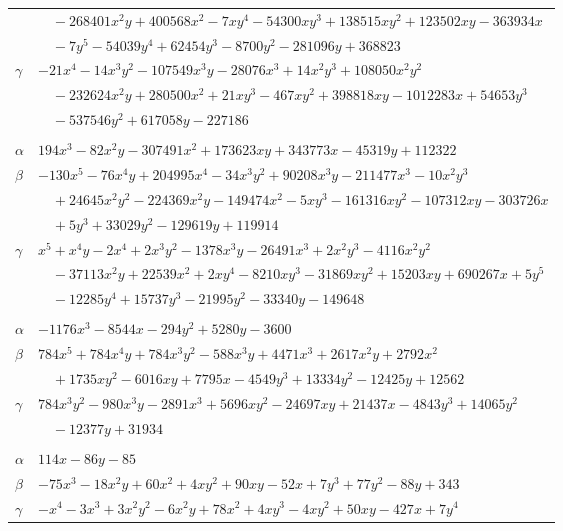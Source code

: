 \documentclass[11pt]{article}
\begin{document}
\begin{longtable}{@{}ll@{}}
 & $\quad -268401x^{2}y+400568x^{2}-7xy^{4}-54300xy^{3}+138515xy^{2}+123502xy-363934x$\\
 & $\quad -7y^{5}-54039y^{4}+62454y^{3}-8700y^{2}-281096y+368823$\\
$\gamma$ & $-21x^{4}-14x^{3}y^{2}-107549x^{3}y-28076x^{3}+14x^{2}y^{3}+108050x^{2}y^{2}$\\
 & $\quad -232624x^{2}y+280500x^{2}+21xy^{3}-467xy^{2}+398818xy-1012283x+54653y^{3}$\\
 & $\quad -537546y^{2}+617058y-227186$\\
\addlinespace[3pt]
\multicolumn{2}{@{}l}{$\{i,j\}=\{62,182\}$, $k_{ij}=2^{6}\cdot 3^{6}\cdot 13$}\\
$\alpha$ & $194x^{3}-82x^{2}y-307491x^{2}+173623xy+343773x-45319y+112322$\\
$\beta$ & $-130x^{5}-76x^{4}y+204995x^{4}-34x^{3}y^{2}+90208x^{3}y-211477x^{3}-10x^{2}y^{3}$\\
 & $\quad +24645x^{2}y^{2}-224369x^{2}y-149474x^{2}-5xy^{3}-161316xy^{2}-107312xy-303726x$\\
 & $\quad +5y^{3}+33029y^{2}-129619y+119914$\\
$\gamma$ & $x^{5}+x^{4}y-2x^{4}+2x^{3}y^{2}-1378x^{3}y-26491x^{3}+2x^{2}y^{3}-4116x^{2}y^{2}$\\
 & $\quad -37113x^{2}y+22539x^{2}+2xy^{4}-8210xy^{3}-31869xy^{2}+15203xy+690267x+5y^{5}$\\
 & $\quad -12285y^{4}+15737y^{3}-21995y^{2}-33340y-149648$\\
\addlinespace[3pt]
\multicolumn{2}{@{}l}{$\{i,j\}=\{62,184\}$, $k_{ij}=2^{5}\cdot 3^{4}\cdot 13$}\\
$\alpha$ & $-1176x^{3}-8544x-294y^{2}+5280y-3600$\\
$\beta$ & $784x^{5}+784x^{4}y+784x^{3}y^{2}-588x^{3}y+4471x^{3}+2617x^{2}y+2792x^{2}$\\
 & $\quad +1735xy^{2}-6016xy+7795x-4549y^{3}+13334y^{2}-12425y+12562$\\
$\gamma$ & $784x^{3}y^{2}-980x^{3}y-2891x^{3}+5696xy^{2}-24697xy+21437x-4843y^{3}+14065y^{2}$\\
 & $\quad -12377y+31934$\\
\addlinespace[3pt]
\multicolumn{2}{@{}l}{$\{i,j\}=\{62,207\}$, $k_{ij}=2\cdot 3^{4}$}\\
$\alpha$ & $114x-86y-85$\\
$\beta$ & $-75x^{3}-18x^{2}y+60x^{2}+4xy^{2}+90xy-52x+7y^{3}+77y^{2}-88y+343$\\
$\gamma$ & $-x^{4}-3x^{3}+3x^{2}y^{2}-6x^{2}y+78x^{2}+4xy^{3}-4xy^{2}+50xy-427x+7y^{4}$\\

\end{longtable}
\end{document}
